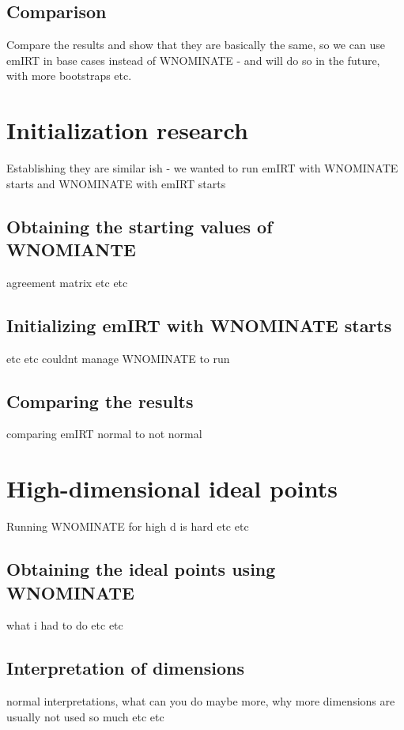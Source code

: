 \documentclass{report}
\begin{document}
    \subsection{Comparison}
    Compare the results and show that they are basically the same, so we can use emIRT in base cases instead
    of WNOMINATE - and will do so in the future, with more bootstraps etc.


    \section{Initialization research}

    Establishing they are similar ish - we wanted to run emIRT with WNOMINATE starts and WNOMINATE with emIRT
    starts

    \subsection{Obtaining the starting values of WNOMIANTE}
    agreement matrix etc etc

    \subsection{Initializing emIRT with WNOMINATE starts}
    etc etc couldnt manage WNOMINATE to run

    \subsection{Comparing the results}
    comparing emIRT normal to not normal


    \section{High-dimensional ideal points}
    Running WNOMINATE for high d is hard etc etc

    \subsection{Obtaining the ideal points using WNOMINATE}
    what i had to do etc etc

    \subsection{Interpretation of dimensions}
    normal interpretations, what can you do maybe more, why more dimensions are usually not used so much etc
    etc
\end{document}
